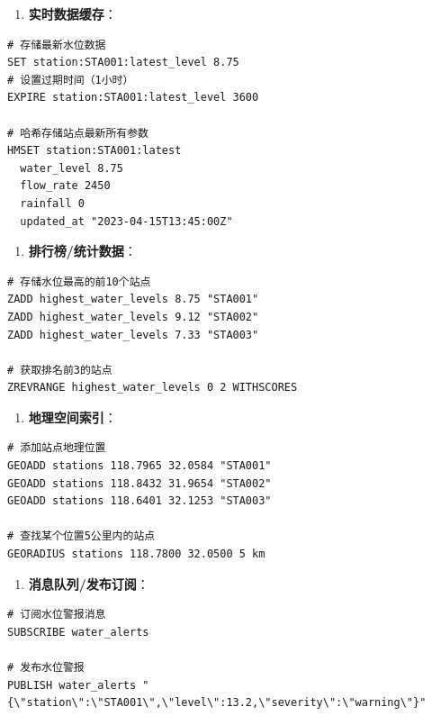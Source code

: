 \begin{enumerate}
\def\labelenumi{\arabic{enumi}.}
\tightlist
\item
  \textbf{实时数据缓存}：
\end{enumerate}

\begin{lstlisting}
# 存储最新水位数据
SET station:STA001:latest_level 8.75
# 设置过期时间（1小时）
EXPIRE station:STA001:latest_level 3600

# 哈希存储站点最新所有参数
HMSET station:STA001:latest 
  water_level 8.75 
  flow_rate 2450 
  rainfall 0 
  updated_at "2023-04-15T13:45:00Z"
\end{lstlisting}

\begin{enumerate}
\def\labelenumi{\arabic{enumi}.}
\setcounter{enumi}{1}
\tightlist
\item
  \textbf{排行榜/统计数据}：
\end{enumerate}

\begin{lstlisting}
# 存储水位最高的前10个站点
ZADD highest_water_levels 8.75 "STA001"
ZADD highest_water_levels 9.12 "STA002"
ZADD highest_water_levels 7.33 "STA003"

# 获取排名前3的站点
ZREVRANGE highest_water_levels 0 2 WITHSCORES
\end{lstlisting}

\begin{enumerate}
\def\labelenumi{\arabic{enumi}.}
\setcounter{enumi}{2}
\tightlist
\item
  \textbf{地理空间索引}：
\end{enumerate}

\begin{lstlisting}
# 添加站点地理位置
GEOADD stations 118.7965 32.0584 "STA001"
GEOADD stations 118.8432 31.9654 "STA002"
GEOADD stations 118.6401 32.1253 "STA003"

# 查找某个位置5公里内的站点
GEORADIUS stations 118.7800 32.0500 5 km
\end{lstlisting}

\begin{enumerate}
\def\labelenumi{\arabic{enumi}.}
\setcounter{enumi}{3}
\tightlist
\item
  \textbf{消息队列/发布订阅}：
\end{enumerate}

\begin{lstlisting}
# 订阅水位警报消息
SUBSCRIBE water_alerts

# 发布水位警报
PUBLISH water_alerts "{\"station\":\"STA001\",\"level\":13.2,\"severity\":\"warning\"}"
\end{lstlisting}

